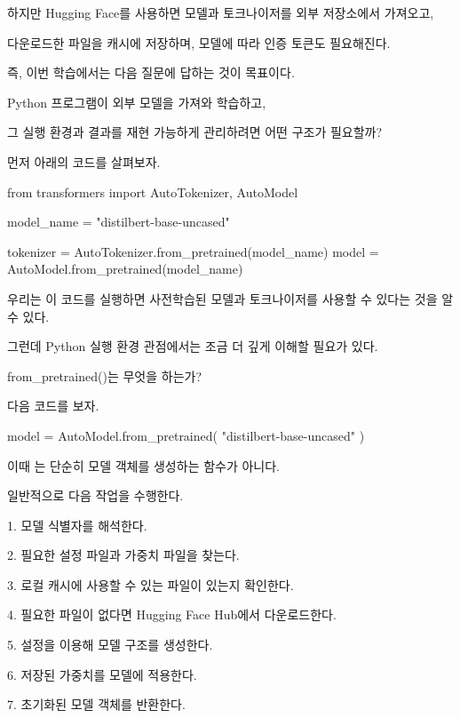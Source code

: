 하지만 Hugging Face를 사용하면 모델과 토크나이저를 외부 저장소에서 가져오고,

다운로드한 파일을 캐시에 저장하며, 모델에 따라 인증 토큰도 필요해진다.

즉, 이번 학습에서는 다음 질문에 답하는 것이 목표이다.

\begin{dhksmry}[centered]
Python 프로그램이 외부 모델을 가져와 학습하고,

그 실행 환경과 결과를 재현 가능하게 관리하려면 어떤 구조가 필요할까?
\end{dhksmry}

먼저 아래의 코드를 살펴보자.

\begin{dhkcode}
from transformers import AutoTokenizer, AutoModel

model_name = "distilbert-base-uncased"

tokenizer = AutoTokenizer.from_pretrained(model_name)
model = AutoModel.from_pretrained(model_name)
\end{dhkcode}

우리는 이 코드를 실행하면 사전학습된 모델과 토크나이저를 사용할 수 있다는 것을 알 수 있다.

그런데 Python 실행 환경 관점에서는 조금 더 깊게 이해할 필요가 있다.

\begin{dhknote}
\begin{dhksmry}[centered]
from_pretrained()는 무엇을 하는가?
\end{dhksmry}
\end{dhknote}

다음 코드를 보자.

\begin{dhkcode}
model = AutoModel.from_pretrained(
    "distilbert-base-uncased"
)
\end{dhkcode}

이때 는 단순히 모델 객체를 생성하는 함수가 아니다.

일반적으로 다음 작업을 수행한다.

\begin{dhksmry}
    1. 모델 식별자를 해석한다.

    2. 필요한 설정 파일과 가중치 파일을 찾는다.

    3. 로컬 캐시에 사용할 수 있는 파일이 있는지 확인한다.

    4. 필요한 파일이 없다면 Hugging Face Hub에서 다운로드한다.

    5. 설정을 이용해 모델 구조를 생성한다.

    6. 저장된 가중치를 모델에 적용한다.

    7. 초기화된 모델 객체를 반환한다.
\end{dhksmry}

